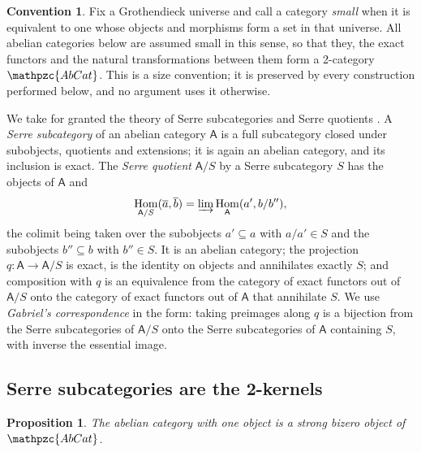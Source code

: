 \documentclass[reqno,a4paper]{amsart}
\numberwithin{equation}{section}
\theoremstyle{plain}
\newtheorem{proposition}[subsection]{Proposition}
\theoremstyle{definition}
\newtheorem{convention}[subsection]{Convention}
\def\dfn#1{{\itshape #1}}
\newenvironment{eqD}[1]{\begin{equation}\label{#1}}{\end{equation}\ignorespacesafterend}
\newcommand{\ov}[1]{\overline{#1}}
\newcommand{\catfont}[1]{\ensuremath{\mathpzc{#1}}\xspace}
\newcommand{\onecat}[1]{\ensuremath{\mathsf{#1}}\xspace}
\newcommand{\AbCat}{\catfont{AbCat}}
\renewcommand{\1}{\onecat{1}}
\DeclareMathOperator{\Hom}{Hom}
\begin{document}
\begin{convention}\label{Conv Size}
	Fix a Grothendieck universe and call a category \dfn{small} when it is equivalent to one whose objects and morphisms form a set in that universe. All abelian categories below are assumed small in this sense, so that they, the exact functors and the natural transformations between them form a 2-category \(\AbCat\). This is a size convention; it is preserved by every construction performed below, and no argument uses it otherwise.
\end{convention}

We take for granted the theory of Serre subcategories and Serre quotients \cite[Chapter~III]{Gabriel62}. A \dfn{Serre subcategory} of an abelian category \(\onecat{A}\) is a full subcategory closed under subobjects, quotients and extensions; it is again an abelian category, and its inclusion is exact. The \dfn{Serre quotient} \(\onecat{A}/S\) by a Serre subcategory \(S\) has the objects of \(\onecat{A}\) and
\begin{eqD}{SerreHom}
	\Hom_{\onecat{A}/S}(\ov{a},\ov{b})=\varinjlim\Hom_{\onecat{A}}(a',b/b'')\text{,}
\end{eqD}
the colimit being taken over the subobjects \(a'\subseteq a\) with \(a/a'\in S\) and the subobjects \(b''\subseteq b\) with \(b''\in S\). It is an abelian category; the projection \(q\colon\onecat{A}\to\onecat{A}/S\) is exact, is the identity on objects and annihilates exactly \(S\); and composition with \(q\) is an equivalence from the category of exact functors out of \(\onecat{A}/S\) onto the category of exact functors out of \(\onecat{A}\) that annihilate \(S\). We use \dfn{Gabriel's correspondence} in the form: taking preimages along \(q\) is a bijection from the Serre subcategories of \(\onecat{A}/S\) onto the Serre subcategories of \(\onecat{A}\) containing \(S\), with inverse the essential image.

\subsection{Serre subcategories are the 2-kernels}\label{SS:ModelAbCat}

\begin{proposition}\label{P:AbCatBizero}
	The abelian category with one object is a strong bizero object of \(\AbCat\).
\end{proposition}
\end{document}
